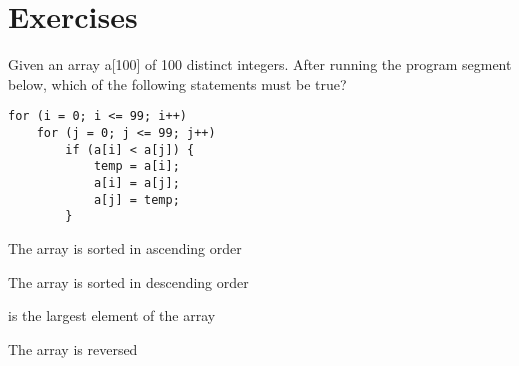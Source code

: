 \section*{Exercises}

\begin{questions}


\miquestion Given an array a[100] of 100 distinct integers. After running the program segment below,
which of the following statements must be true? 

\begin{lstlisting}
for (i = 0; i <= 99; i++)
    for (j = 0; j <= 99; j++)
        if (a[i] < a[j]) {
            temp = a[i];
            a[i] = a[j];
            a[j] = temp;
        }
\end{lstlisting}

\begin{multiplechoice}
    \item The array is sorted in ascending order
    \item The array is sorted in descending order
    \item {} is the largest element of the array
    \item The array is reversed
\end{multiplechoice}

\label{q:hkoi:2022hs:q10}

\end{questions}